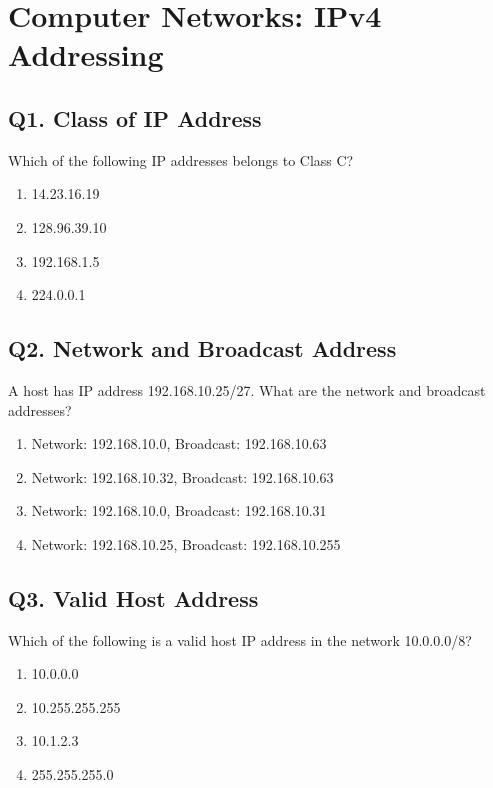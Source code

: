 \section{Computer Networks: IPv4 Addressing}

\subsection*{Q1. Class of IP Address}
Which of the following IP addresses belongs to Class C?

\begin{enumerate}[label=(\alph*)]
    \item 14.23.16.19  
    \item 128.96.39.10  
    \item 192.168.1.5  
    \item 224.0.0.1  
\end{enumerate}

\vspace{1em}
\subsection*{Q2. Network and Broadcast Address}
A host has IP address 192.168.10.25/27. What are the network and broadcast addresses?

\begin{enumerate}[label=(\alph*)]
    \item Network: 192.168.10.0, Broadcast: 192.168.10.63  
    \item Network: 192.168.10.32, Broadcast: 192.168.10.63  
    \item Network: 192.168.10.0, Broadcast: 192.168.10.31  
    \item Network: 192.168.10.25, Broadcast: 192.168.10.255  
\end{enumerate}

\vspace{1em}
\subsection*{Q3. Valid Host Address}
Which of the following is a valid host IP address in the network 10.0.0.0/8?

\begin{enumerate}[label=(\alph*)]
    \item 10.0.0.0  
    \item 10.255.255.255  
    \item 10.1.2.3  
    \item 255.255.255.0  
\end{enumerate}

